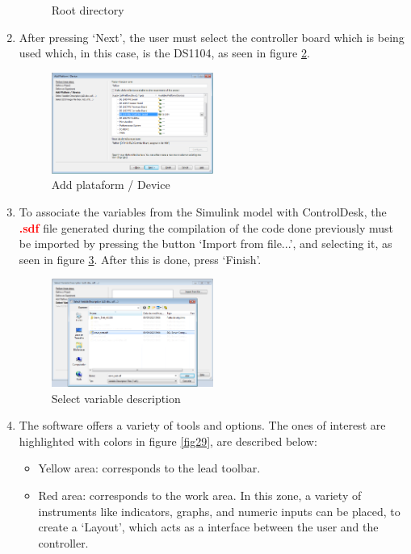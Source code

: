\begin{enumerate}
\begin{figure}[H]
        \caption{Root directory}
        \label{fig26}
    \end{figure}
    \item After pressing ‘Next’, the user must select the controller board which is being used which, in this case, is the DS1104, as seen in figure \ref{fig27}.
    \begin{figure}[H]
        \centering
        \includegraphics[width=0.5\textwidth]{Images/Ball and Bean/ControlDesk/CD4.png}
        \caption{Add plataform / Device}
        \label{fig27}
    \end{figure}
    \item To associate the variables from the Simulink model with ControlDesk, the \textcolor{red}{\textbf{.sdf}} file generated during the compilation of the code done previously must be imported by pressing the button ‘Import from file...’, and selecting it, as seen in figure \ref{fig28}. After this is done, press ‘Finish’.
    \begin{figure}[H]
        \centering
        \includegraphics[width=0.5\textwidth]{Images/Ball and Bean/ControlDesk/CD5.png}
        \caption{Select variable description}
        \label{fig28}
    \end{figure}
    \item The software offers a variety of tools and options. The ones of interest are highlighted with colors in figure \ref{fig29}, are described below:
    \begin{itemize}
        \item Yellow area: corresponds to the lead toolbar.
        \item Red area: corresponds to the work area. In this zone, a variety of instruments like indicators, graphs, and numeric inputs can be placed, to create a ‘Layout’, which acts as a interface between the user and the controller.

\end{itemize}
\end{enumerate}
